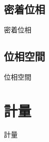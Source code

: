 \newpage


\subsection{密着位相}

密着位相

\newpage


\subsection{位相空間}

位相空間

\newpage


\section{計量}

計量

\newpage

